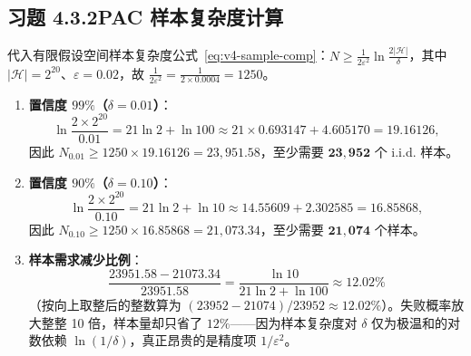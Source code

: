 \subsection*{习题 4.3.2\quad PAC 样本复杂度计算}
代入有限假设空间样本复杂度公式~\eqref{eq:v4-sample-comp}：$N \ge \frac{1}{2\varepsilon^2}\ln\frac{2|\mathcal{H}|}{\delta}$，其中 $|\mathcal{H}| = 2^{20}$、$\varepsilon = 0.02$，故 $\frac{1}{2\varepsilon^2} = \frac{1}{2 \times 0.0004} = 1250$。
\begin{enumerate}[label=(\arabic*), leftmargin=1.8em]
  \item \textbf{置信度 $99\%$（$\delta = 0.01$）}：
  \[
    \ln\frac{2 \times 2^{20}}{0.01} = 21\ln 2 + \ln 100 \approx 21 \times 0.693147 + 4.605170 = 19.16126,
  \]
  因此 $N_{0.01} \ge 1250 \times 19.16126 = 23{,}951.58$，至少需要 $\mathbf{23{,}952}$ 个 i.i.d. 样本。
  \item \textbf{置信度 $90\%$（$\delta = 0.10$）}：
  \[
    \ln\frac{2 \times 2^{20}}{0.10} = 21\ln 2 + \ln 10 \approx 14.55609 + 2.302585 = 16.85868,
  \]
  因此 $N_{0.10} \ge 1250 \times 16.85868 = 21{,}073.34$，至少需要 $\mathbf{21{,}074}$ 个样本。
  \item \textbf{样本需求减少比例}：
  \[
    \frac{23951.58 - 21073.34}{23951.58} = \frac{\ln 10}{21\ln 2 + \ln 100} \approx \mathbf{12.02\%}
  \]
  （按向上取整后的整数算为 $(23952 - 21074)/23952 \approx 12.02\%$）。失败概率放大整整 10 倍，样本量却只省了 $12\%$——因为样本复杂度对 $\delta$ 仅为极温和的对数依赖 $\ln(1/\delta)$，真正昂贵的是精度项 $1/\varepsilon^2$。
\end{enumerate}

